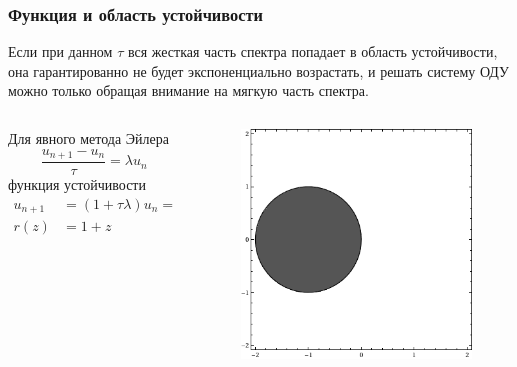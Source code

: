 \documentclass[professionalfonts,compress,unicode,aspectratio=169]{beamer}
\begin{document}
\begin{frame}\frametitle{Функция и область устойчивости}
	Если при данном $\tau$ вся жесткая часть спектра попадает в область устойчивости, она гарантированно не будет экспоненциально возрастать, и
	решать систему ОДУ можно только обращая внимание на мягкую часть спектра.

	\begin{columns}[T]
	\begin{column}{.5\textwidth}
	Для явного метода Эйлера
	\[
	\frac{u_{n+1}-u_n}{\tau} = \lambda u_n
	\]
	функция устойчивости
	\begin{align*}
	u_{n+1} &= (1 + \tau \lambda)u_n = (1+z) u_n\\
	r(z) &= 1+z
	\end{align*}
	\end{column}
	\begin{column}{.5\textwidth}
	\begin{figure}%
	\includegraphics[height=.55\textheight]{euler.png}%
	\end{figure}
	\end{column}
	\end{columns}
\end{frame}
\end{document}
